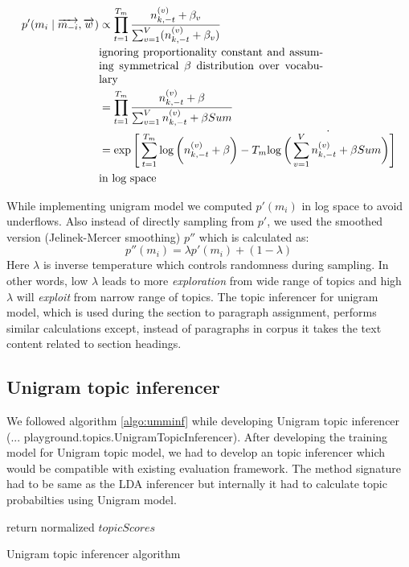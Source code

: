 \begin{align*}
p'(m_i \mid \overrightarrow{m_{-i}}, \overrightarrow{w}) & \propto
   \prod_{t=1}^{T_m} \frac{n_{k,-t}^{(v)}+\beta_v}{\sum_{v=1}^V (n_{k,-t}^{(v)}+\beta_v)} \\
   & \parbox{20em}{ignoring proportionality constant and assuming symmetrical $ \beta$ distribution over vocabulary} \\
   &= \prod_{t=1}^{T_m} \frac{n_{k,-t}^{(v)}+\beta}{\sum_{v=1}^V n_{k,-t}^{(v)}+\beta Sum}  \\
   &= \exp \Bigg[ \sum_{t=1}^{T_m} \log \bigg( n_{k,-t}^{(v)}+\beta \bigg)-T_m \dot{\log \bigg( \sum_{v=1}^V n_{k,-t}^{(v)}+\beta Sum \bigg)} \Bigg] \\
   & \text{in log space}
\end{align*}

While implementing unigram model we computed $ p'(m_i)$ in log space to avoid underflows. Also instead of directly sampling from $ p'$, we used the smoothed version (Jelinek-Mercer smoothing) $ p''$ which is calculated as:
$$ p''(m_i) = \lambda p'(m_i) + (1- \lambda) $$
Here $ \lambda$ is inverse temperature which controls randomness during sampling. In other words, low $ \lambda$ leads to more \textit{exploration} from wide range of topics and high $ \lambda$ will \textit{exploit} from narrow range of topics. The topic inferencer for unigram model, which is used during the section to paragraph assignment, performs similar calculations except, instead of paragraphs in corpus it takes the text content related to section headings.
\subsection{Unigram topic inferencer}
We followed algorithm \ref{algo:umminf} while developing Unigram topic inferencer (... playground.topics.UnigramTopicInferencer). After developing the training model for Unigram topic model, we had to develop an topic inferencer which would be compatible with existing evaluation framework. The method signature had to be same as the LDA inferencer but internally it had to calculate topic probabilties using Unigram model.
\begin{algorithm}[htp]
\label{algo:umminf}
 return normalized $topicScores$\;
 \caption{Unigram topic inferencer algorithm}
\end{algorithm}

